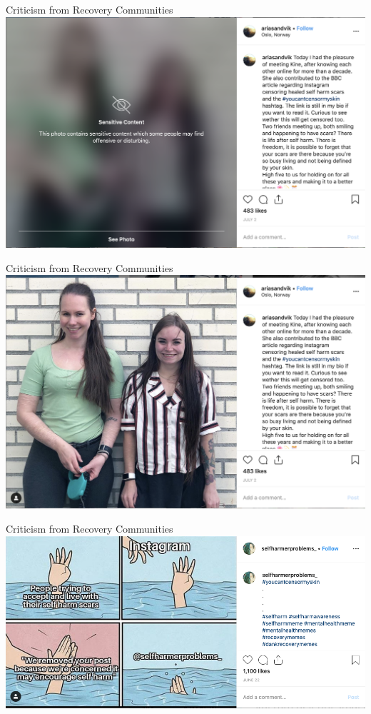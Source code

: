 \documentclass[nobackground,dvipsnames,table,aspectratio=169]{beamer}
\begin{document}
\begin{frame}{Criticism from Recovery Communities}
    \includegraphics[width=\textwidth]{recovery-community-criticism-1}
\end{frame}

\begin{frame}{Criticism from Recovery Communities}
    \includegraphics[width=\textwidth]{recovery-community-criticism-2}
\end{frame}

\begin{frame}{Criticism from Recovery Communities}
    \includegraphics[width=\textwidth]{recovery-community-criticism-3}
\end{frame}
\end{document}
